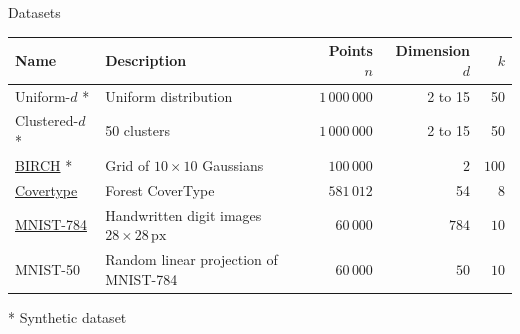 \documentclass[10pt, compress]{beamer}
\begin{document}
\begin{frame}{Datasets}
  \small
\centering
\label{tab:datasets}
\begin{tabularx}{\textwidth}{lXrrr}
\hline
Name & Description & Points $n$ & Dimension $d$ & $k$ \\
\hline
Uniform-$d$ * & Uniform distribution & $1 \, 000 \, 000$ & 2 to 15 & 50 \\
Clustered-$d$ * & 50 clusters & $1 \, 000 \, 000$ & 2 to 15 & 50 \\
\href{http://cs.joensuu.fi/sipu/datasets/}{BIRCH} * & Grid of $10\times 10$ Gaussians & $100 \, 000$ & $2$ & $100$ \\
\hline
\href{https://archive.ics.uci.edu/ml/datasets/Covertype}{Covertype} & Forest CoverType & $581 \, 012$ & 54 & 8 \\
\href{http://yann.lecun.com/exdb/mnist/}{MNIST-784} & Handwritten digit images $28\times 28\,\mathrm{px}$ & $60 \, 000$ & $784$ & $10$ \\
MNIST-50 & Random linear projection of MNIST-784 & $60 \, 000$ & $50$ & $10$ \\
\hline
\end{tabularx}

* Synthetic dataset
\end{frame}
\end{document}
